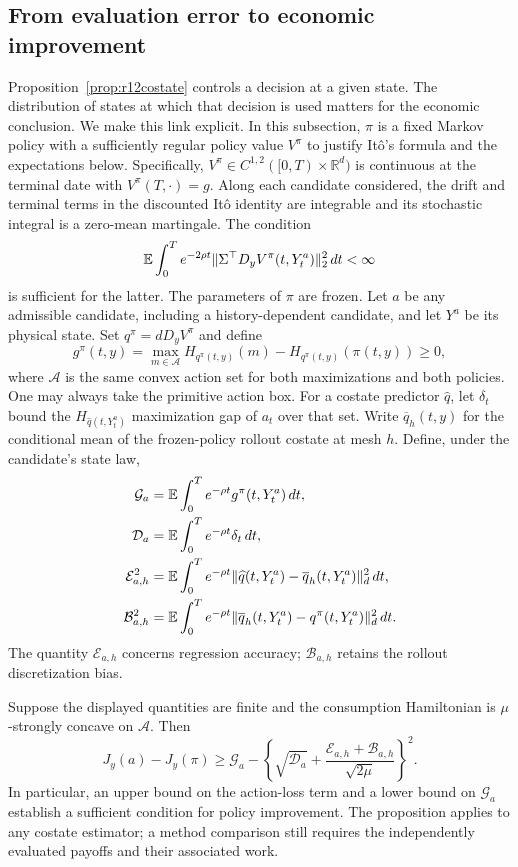 \subsection{From evaluation error to economic improvement}
\label{sec:r14costate}
Proposition~\ref{prop:r12costate} controls a decision at a given state.
The distribution of states at which that decision is used matters for
the economic conclusion. We make this link explicit. In this subsection,
$\pi$ is a fixed Markov policy with a sufficiently regular policy value
$V^\pi$ to justify It\^o's formula and the expectations below. Specifically, $V^\pi\in C^{1,2}([0,T)\times\mathbb R^d)$ is continuous at the terminal date with $V^\pi(T,\cdot)=g$. Along each candidate considered, the drift and terminal terms in the discounted It\^o identity are integrable and its stochastic integral is a zero-mean martingale. The condition
\[
 \mathbb E\int_0^T e^{-2\rho t}
 \|\Sigma^\top D_yV^\pi(t,Y_t^a)\|_2^2\,dt<\infty
\]
is sufficient for the latter. The parameters of $\pi$ are frozen. Let $a$ be any admissible candidate, including
a history-dependent candidate, and let $Y^a$ be its physical state.
Set $q^\pi=dD_yV^\pi$ and define
\[
 g^\pi(t,y)=\max_{m\in\mathcal A}H_{q^\pi(t,y)}(m)
                 -H_{q^\pi(t,y)}(\pi(t,y))\geq0,
\]
where $\mathcal A$ is the same convex action set for both maximizations
and both policies. One may always take the primitive action box.
For a costate predictor $\widehat q$, let $\delta_t$ bound the
$H_{\widehat q(t,Y_t^a)}$ maximization gap of $a_t$ over that set.
Write $\overline q_h(t,y)$ for the conditional mean of the frozen-policy
rollout costate at mesh $h$. Define, under the candidate's state law,
\begin{align*}
 \mathcal G_a&=\mathbb E\int_0^T e^{-\rho t}g^\pi(t,Y_t^a)\,dt,\\
 \mathcal D_a&=\mathbb E\int_0^T e^{-\rho t}\delta_t\,dt,\\
 \mathcal E_{a,h}^2&=\mathbb E\int_0^T e^{-\rho t}
      \|\widehat q(t,Y_t^a)-\overline q_h(t,Y_t^a)\|_d^2\,dt,\\
 \mathcal B_{a,h}^2&=\mathbb E\int_0^T e^{-\rho t}
      \|\overline q_h(t,Y_t^a)-q^\pi(t,Y_t^a)\|_d^2\,dt.
\end{align*}
The quantity $\mathcal E_{a,h}$ concerns regression accuracy;
$\mathcal B_{a,h}$ retains the rollout discretization bias.

\begin{proposition}
\label{prop:r14economiccostate}
Suppose the displayed quantities are finite and the consumption
Hamiltonian is $\mu$-strongly concave on $\mathcal A$. Then
\begin{equation}\label{eq:r14economiccostate}
 J_y(a)-J_y(\pi)\geq
 \mathcal G_a-
 \left\{\sqrt{\mathcal D_a}
       +\frac{\mathcal E_{a,h}+\mathcal B_{a,h}}{\sqrt{2\mu}}
 \right\}^{\!2}.
\end{equation}
In particular, an upper bound on the action-loss term and a lower bound
on $\mathcal G_a$ establish a sufficient condition for policy
improvement. The proposition applies to any costate estimator; a
method comparison still requires the independently evaluated payoffs
and their associated work.
\end{proposition}

